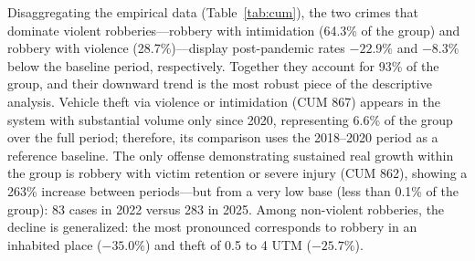 \documentclass[pdflatex,sn-basic]{sn-jnl}
\begin{document}
Disaggregating the empirical data (Table~\ref{tab:cum}), the two crimes that dominate violent robberies---robbery with intimidation (64.3\% of the group) and robbery with violence (28.7\%)---display post-pandemic rates $-22.9\%$ and $-8.3\%$ below the baseline period, respectively. Together they account for 93\% of the group, and their downward trend is the most robust piece of the descriptive analysis. Vehicle theft via violence or intimidation (CUM 867) appears in the system with substantial volume only since 2020, representing 6.6\% of the group over the full period; therefore, its comparison uses the 2018--2020 period as a reference baseline. The only offense demonstrating sustained real growth within the group is robbery with victim retention or severe injury (CUM 862), showing a 263\% increase between periods---but from a very low base (less than 0.1\% of the group): 83 cases in 2022 versus 283 in 2025. Among non-violent robberies, the decline is generalized: the most pronounced corresponds to robbery in an inhabited place ($-35.0\%$) and theft of 0.5 to 4 UTM ($-25.7\%$).
\end{document}
